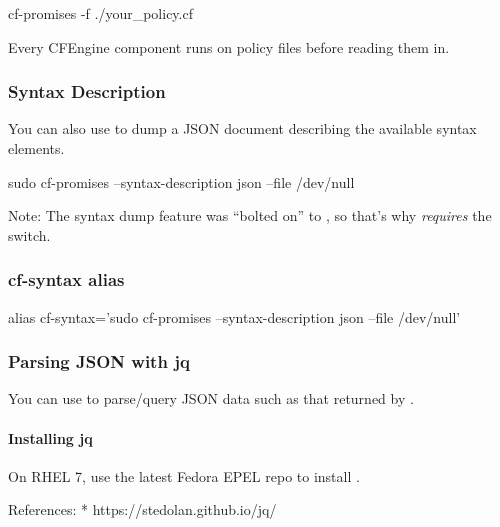 \begin{code}
cf-promises -f ./your_policy.cf
\end{code}
Every CFEngine component runs  on policy files before reading them in.





\subsubsection{Syntax Description}

You can also use  to dump a JSON document
describing the available syntax elements.

\begin{code}
sudo cf-promises --syntax-description json --file /dev/null
\end{code}

Note: The syntax dump feature was ``bolted on'' to ,
so that's why  \emph{requires} the  switch.





\subsubsection{cf-syntax alias}

\begin{code}
alias cf-syntax='sudo cf-promises --syntax-description json --file /dev/null'
\end{code}





\subsubsection{Parsing JSON with jq}

You can use  to parse/query JSON data such as that returned by
.





\paragraph{Installing jq}

On RHEL 7, use the latest Fedora EPEL repo to install .

References:
* https://stedolan.github.io/jq/





